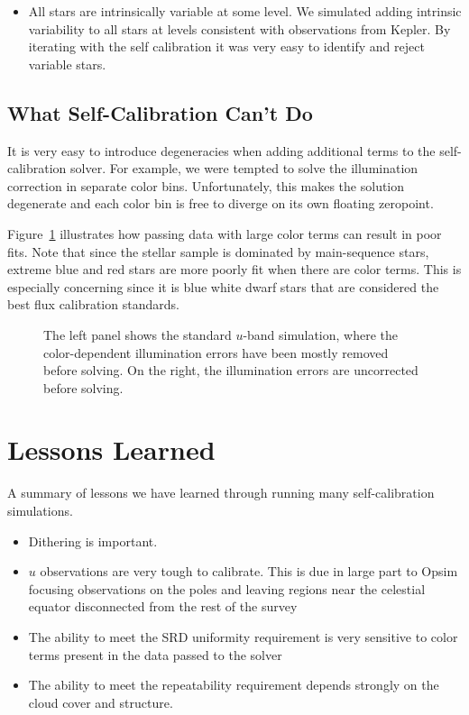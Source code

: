 \documentclass[12pt,preprint]{aastex}
\begin{document}
\begin{itemize}
\item{All stars are intrinsically variable at some level.  We simulated adding intrinsic variability to all stars at levels consistent with observations from Kepler.  By iterating with the self calibration it was very easy to identify and reject variable stars.}
\end{itemize}

\subsection{What Self-Calibration Can't Do}

It is very easy to introduce degeneracies when adding additional terms to the self-calibration solver.  For example, we were tempted to solve the illumination correction in separate color bins.  Unfortunately, this makes the solution degenerate and each color bin is free to diverge on its own floating zeropoint.  

Figure~\ref{fig:badcolor} illustrates how passing data with large color terms can result in poor fits.  Note that since the stellar sample is dominated by main-sequence stars, extreme blue and red stars are more poorly fit when there are color terms.  This is especially concerning since it is blue white dwarf stars that are considered the best flux calibration standards.

\begin{figure}
\caption{The left panel shows the standard $u$-band simulation, where the color-dependent illumination errors have been mostly removed before solving.  On the right,  the illumination errors are uncorrected before solving.  \label{fig:badcolor}}
\end{figure}


\section{Lessons Learned}
A summary of lessons we have learned through running many self-calibration simulations.
\begin{itemize}
\item{Dithering is important.  }
\item{$u$ observations are very tough to calibrate.  This is due in large part to Opsim focusing observations on the poles and leaving regions near the celestial equator disconnected from the rest of the survey}
\item{The ability to meet the SRD uniformity requirement is very sensitive to color terms present in the data passed to the solver}
\item{The ability to meet the repeatability requirement depends strongly on the cloud cover and structure.  }
\end{itemize}
\end{document}
